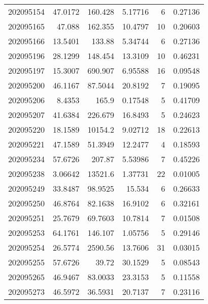 \begin{tabular}{rrrrrr}
 202095154 &         47.0172  &      160.428  &            5.17716 &           6 & 0.27136 \\
 202095165 &         47.088   &      162.355  &           10.4797  &          10 & 0.20603 \\
 202095166 &         13.5401  &      133.88   &            5.34744 &           6 & 0.27136 \\
 202095196 &         28.1299  &      148.454  &           13.3109  &          10 & 0.46231 \\
 202095197 &         15.3007  &      690.907  &            6.95588 &          16 & 0.09548 \\
 202095200 &         46.1167  &       87.5044 &           20.8192  &           7 & 0.19095 \\
 202095206 &          8.4353  &      165.9    &            0.17548 &           5 & 0.41709 \\
 202095207 &         41.6384  &      226.679  &           16.8493  &           5 & 0.24623 \\
 202095220 &         18.1589  &    10154.2    &            9.02712 &          18 & 0.22613 \\
 202095221 &         47.1589  &       51.3949 &           12.2477  &           4 & 0.18593 \\
 202095234 &         57.6726  &      207.87   &            5.53986 &           7 & 0.45226 \\
 202095238 &          3.06642 &    13521.6    &            1.37731 &          22 & 0.01005 \\
 202095249 &         33.8487  &       98.9525 &           15.534   &           6 & 0.26633 \\
 202095250 &         46.8764  &       82.1638 &           16.9102  &           6 & 0.32161 \\
 202095251 &         25.7679  &       69.7603 &           10.7814  &           7 & 0.01508 \\
 202095253 &         64.1761  &      146.107  &            1.05756 &           5 & 0.29146 \\
 202095254 &         26.5774  &     2590.56   &           13.7606  &          31 & 0.03015 \\
 202095255 &         57.6726  &       39.72   &           30.1529  &           5 & 0.08543 \\
 202095265 &         46.9467  &       83.0033 &           23.3153  &           5 & 0.11558 \\
 202095273 &         46.5972  &       36.5931 &           20.7137  &           7 & 0.23116 \\

\end{tabular}
